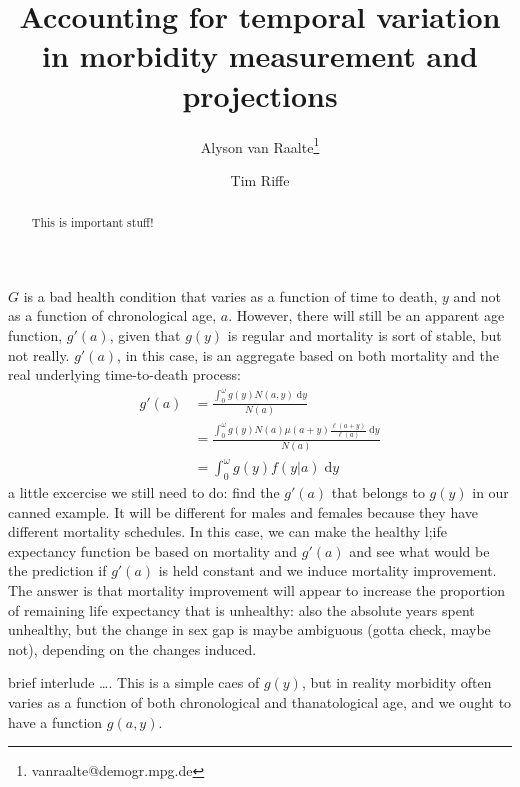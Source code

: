 \documentclass[11pt,oneside,a4paper]{article} %
\newcommand{\dd}{\; \mathrm{d}}
\begin{document}
\title{Accounting for temporal variation in morbidity measurement
and projections}

\author[1]{Alyson van Raalte\thanks{vanraalte@demogr.mpg.de}}
\author[1]{Tim Riffe}


\maketitle

\begin{abstract}
This is important stuff!
\end{abstract}

$G$ is a bad health condition that varies as a function of time to death,
$y$ and not as a function of chronological age, $a$. However, there will still be an
apparent age function, $g'(a)$, given that $g(y)$ is regular and mortality is
sort of stable, but not really. $g'(a)$, in this case, is an aggregate based on
both mortality and the real underlying time-to-death process:
\begin{align}
g'(a) &= \frac{\int _0^\omega g(y) N(a,y) \dd y}{N(a)} \\
      &= \frac{\int _0^\omega g(y) N(a)
      \mu(a+y)\frac{\ell(a+y)}{\ell(a)}\dd y}{N(a)}\\
      &= \int _0^\omega g(y) f(y|a)\dd y
\end{align}
a little excercise we still need to do: find the $g'(a)$ that belongs to $g(y)$
in our canned example. It will be different for males and females because they
have different mortality schedules. In this case, we can make the healthy l;ife
expectancy function be based on mortality and $g'(a)$ and see what would be the
prediction if $g'(a)$ is held constant and we induce mortality improvement. The
answer is that mortality improvement will appear to increase the proportion of
remaining life expectancy that is unhealthy: also the absolute years spent
unhealthy, but the change in sex gap is maybe ambiguous (gotta check, maybe
not), depending on the changes induced.


brief interlude \ldots.
This is a simple caes of $g(y)$, but in reality morbidity often varies as a
function of both chronological and thanatological age, and we ought to have a
function $g(a,y)$.
\end{document}
